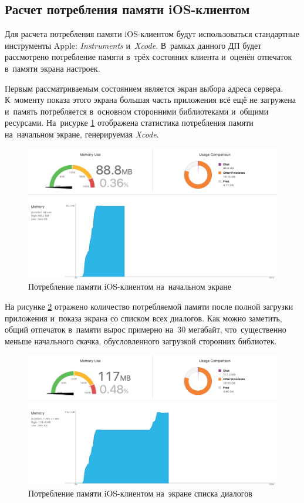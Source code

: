 \subsection{Расчет потребления памяти iOS-клиентом}
\label{sec:eng:memory}

Для расчета потребления памяти iOS-клиентом будут использоваться стандартные инструменты Apple: \textit{Instruments} и~\textit{Xcode}. В~рамках данного ДП будет рассмотрено потребление памяти в~трёх состояних клиента и~оценён отпечаток в~памяти экрана настроек.

Первым рассматриваемым состоянием является экран выбора адреса сервера. К~моменту показа этого экрана большая часть приложения всё ещё не загружена и~память потребляется в~основном сторонними библиотеками и~общими ресурсами. На~рисурке \ref{sec:eng:memory:initial} отображена статистика потребления памяти на~начальном экране, генерируемая \textit{Xcode}.

\begin{figure}[h]
  \centering
    \includegraphics[width=1\textwidth]{inc/img/memory_initial.png}
  \caption{Потребление памяти iOS-клиентом на~начальном экране}
  \label{sec:eng:memory:initial}
\end{figure}

На рисунке \ref{sec:eng:memory:used} отражено количество потребляемой памяти после полной загрузки приложения и~показа экрана со списком всех диалогов. Как можно заметить, общий отпечаток в~памяти вырос примерно на~30 мегабайт, что~существенно меньше начального скачка, обусловленного загрузкой сторонних библиотек.

\begin{figure}[h]
  \centering
    \includegraphics[width=1\textwidth]{inc/img/memory_used.png}
  \caption{Потребление памяти iOS-клиентом на~экране списка диалогов}
  \label{sec:eng:memory:used}
\end{figure}

